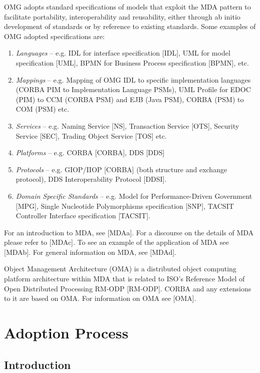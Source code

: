 OMG adopts standard specifications of models that exploit the MDA pattern to facilitate portability, interoperability and reusability, either through ab initio development of standards or by reference to existing standards. Some examples of OMG adopted specifications are:

\begin{enumerate}
\item \textit{Languages} -- e.g. IDL for interface specification [IDL], UML for model specification [UML], BPMN for Business Process specification [BPMN], etc.
\item \textit{Mappings} -- e.g. Mapping of OMG IDL to specific implementation languages (CORBA PIM to Implementation Language PSMs), UML Profile for EDOC (PIM) to CCM (CORBA PSM) and EJB (Java PSM), CORBA (PSM) to COM (PSM) etc.
\item \textit{Services} -- e.g. Naming Service [NS], Transaction Service [OTS], Security Service [SEC], Trading Object Service [TOS] etc.
\item \textit{Platforms} -- e.g. CORBA [CORBA], DDS [DDS]
\item \textit{Protocols} -- e.g. GIOP/IIOP [CORBA] (both structure and exchange protocol), DDS Interoperability Protocol [DDSI].
\item \textit{Domain Specific Standards} -- e.g. Model for Performance-Driven Government [MPG], Single Nucleotide Polymorphisms specification [SNP], TACSIT Controller Interface specification [TACSIT].
\end{enumerate}

For an introduction to MDA, see [MDAa]. For a discourse on the details of MDA please refer to [MDAc]. To see an example of the application of MDA see [MDAb]. For general information on MDA, see [MDAd].

Object Management Architecture (OMA) is a distributed object computing platform architecture within MDA that is related to ISO's Reference Model of Open Distributed Processing RM-ODP [RM-ODP]. CORBA and any extensions to it are based on OMA. For information on OMA see [OMA].


\section{Adoption Process}\label{adoption}
\subsection{Introduction}

